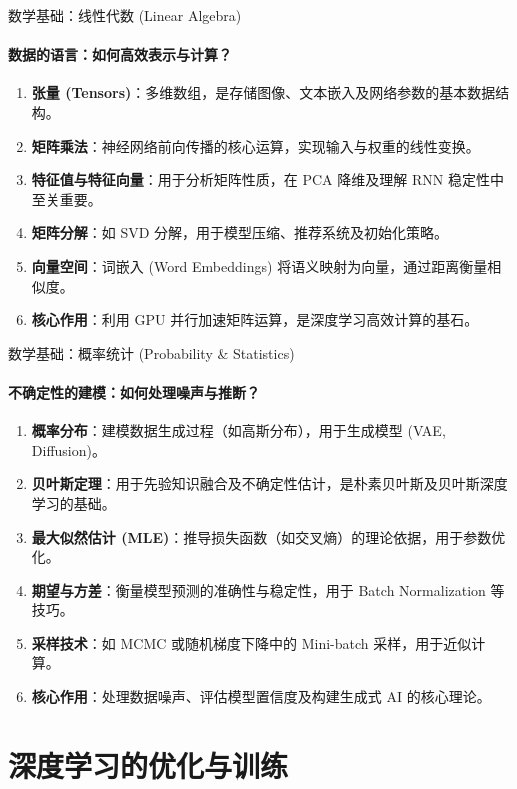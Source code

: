 \documentclass[12pt, t, aspectratio=169]{beamer}
\begin{document}
\begin{frame}{数学基础：线性代数 (Linear Algebra)}
    \framesubtitle{数据的语言：如何高效表示与计算？}
    \begin{enumerate}
        \item \textbf{张量 (Tensors)}：多维数组，是存储图像、文本嵌入及网络参数的基本数据结构。
        \item \textbf{矩阵乘法}：神经网络前向传播的核心运算，实现输入与权重的线性变换。
        \item \textbf{特征值与特征向量}：用于分析矩阵性质，在 PCA 降维及理解 RNN 稳定性中至关重要。
        \item \textbf{矩阵分解}：如 SVD 分解，用于模型压缩、推荐系统及初始化策略。
        \item \textbf{向量空间}：词嵌入 (Word Embeddings) 将语义映射为向量，通过距离衡量相似度。
        \item \textbf{核心作用}：利用 GPU 并行加速矩阵运算，是深度学习高效计算的基石。
    \end{enumerate}
\end{frame}

\begin{frame}{数学基础：概率统计 (Probability \& Statistics)}
    \framesubtitle{不确定性的建模：如何处理噪声与推断？}
    \begin{enumerate}
        \item \textbf{概率分布}：建模数据生成过程（如高斯分布），用于生成模型 (VAE, Diffusion)。
        \item \textbf{贝叶斯定理}：用于先验知识融合及不确定性估计，是朴素贝叶斯及贝叶斯深度学习的基础。
        \item \textbf{最大似然估计 (MLE)}：推导损失函数（如交叉熵）的理论依据，用于参数优化。
        \item \textbf{期望与方差}：衡量模型预测的准确性与稳定性，用于 Batch Normalization 等技巧。
        \item \textbf{采样技术}：如 MCMC 或随机梯度下降中的 Mini-batch 采样，用于近似计算。
        \item \textbf{核心作用}：处理数据噪声、评估模型置信度及构建生成式 AI 的核心理论。
    \end{enumerate}
\end{frame}

\section{深度学习的优化与训练}
\end{document}
